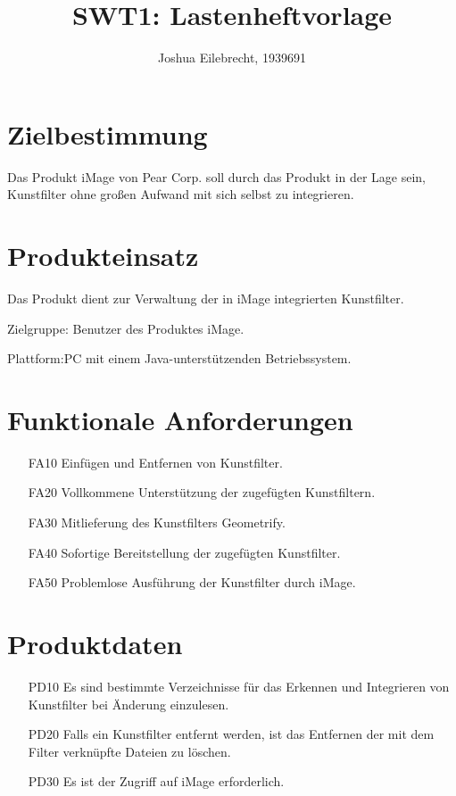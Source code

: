 \documentclass[parskip=full]{scrartcl}
\title{SWT1: Lastenheftvorlage}
\author{Joshua Eilebrecht, 1939691}
\begin{document}
\maketitle

%
%
%
\section{Zielbestimmung}
Das Produkt \gls{iMage} von \gls{Pear Corp.} soll durch das Produkt in der Lage sein, \gls{Kunstfilter} ohne großen Aufwand mit sich selbst zu integrieren.

\section{Produkteinsatz}
Das Produkt dient zur Verwaltung der in iMage integrierten Kunstfilter.

Zielgruppe: Benutzer des Produktes iMage.

Plattform:PC mit einem \gls{Java}-unterstützenden \gls{Betriebssystem}.

\section{Funktionale Anforderungen}
\begin{itemize}[nosep]
\item[FA10] Einfügen und Entfernen von Kunstfilter.
\item[FA20] Vollkommene Unterstützung der zugefügten Kunstfiltern.
\item[FA30] Mitlieferung des Kunstfilters \gls{Geometrify}.
\item[FA40] Sofortige Bereitstellung der zugefügten Kunstfilter.
\item[FA50] Problemlose Ausführung der Kunstfilter durch iMage.
\end{itemize}

\newpage
\section{Produktdaten}
\begin{itemize}[nosep]
\item[PD10] Es sind bestimmte Verzeichnisse für das Erkennen und Integrieren von Kunstfilter bei Änderung einzulesen.
\item[PD20] Falls ein Kunstfilter entfernt werden, ist das Entfernen der mit dem Filter verknüpfte Dateien zu löschen.
\item[PD30] Es ist der Zugriff auf iMage erforderlich.
\end{itemize}
\end{document}
